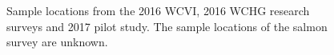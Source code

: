 \documentclass[12pt]{article}\usepackage[]{graphicx}\usepackage[]{color}
\begin{document}
\begin{figure}[htb]

{\centering {} 

}

\caption{Sample locations from the 2016 WCVI, 2016 WCHG research surveys and 2017 pilot study. The sample locations of the salmon survey are unknown.}\label{fig:figure1}
\end{figure}
\end{document}
